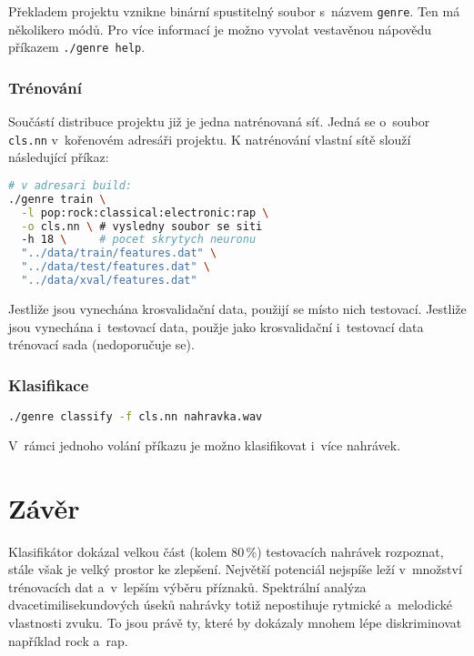\documentclass[10pt,a4paper,twocolumn]{article}
\begin{document}
Překladem projektu vznikne binární spustitelný soubor
s~názvem \verb|genre|. Ten má několikero módů.
Pro více informací je možno vyvolat vestavěnou nápovědu
příkazem \verb|./genre help|.

\subsubsection{Trénování}

Součástí distribuce projektu již je jedna natrénovaná síť.
Jedná se o~soubor \verb|cls.nn| v~kořenovém adresáři projektu.
K natrénování vlastní sítě slouží následující příkaz:

\begin{lstlisting}[language=sh]
# v adresari build:
./genre train \
  -l pop:rock:classical:electronic:rap \
  -o cls.nn \ # vysledny soubor se siti
  -h 18 \     # pocet skrytych neuronu
  "../data/train/features.dat" \
  "../data/test/features.dat" \
  "../data/xval/features.dat"
\end{lstlisting}

Jestliže jsou vynechána krosvalidační data, použijí se místo nich testovací.
Jestliže jsou vynechána i~testovací data, použje jako krosvalidační i~testovací data
trénovací sada (nedoporučuje se).

\subsubsection{Klasifikace}

\begin{lstlisting}[language=sh]
./genre classify -f cls.nn nahravka.wav
\end{lstlisting}

V~rámci jednoho volání příkazu je možno klasifikovat i~více nahrávek.

\section{Závěr}

Klasifikátor dokázal velkou část (kolem 80\,\%) testovacích nahrávek rozpoznat,
stále však je velký prostor ke zlepšení.
Největší potenciál nejspíše leží v~množství trénovacích dat
a~v~lepším výběru příznaků. Spektrální analýza dvacetimilisekundových
úseků nahrávky totiž nepostihuje rytmické a~melodické vlastnosti zvuku.
To jsou právě ty, které by dokázaly mnohem lépe diskriminovat
například rock a~rap.
\end{document}
